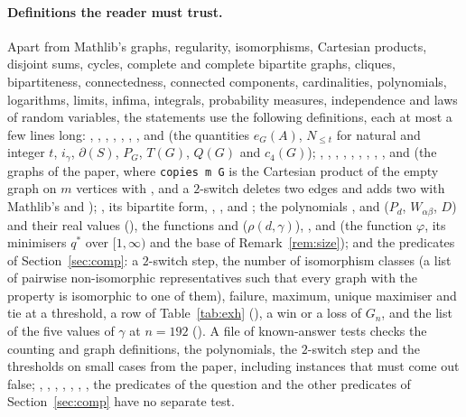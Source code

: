 \documentclass[11pt]{article}
\theoremstyle{remark}
\newcommand{\Nle}[1]{N_{\le #1}}
\begin{document}
\paragraph{Definitions the reader must trust.}
Apart from Mathlib's graphs, regularity, isomorphisms, Cartesian products,
disjoint sums, cycles, complete and complete bipartite graphs, cliques,
bipartiteness, connectedness, connected components, cardinalities,
polynomials, logarithms, limits, infima, integrals, probability measures,
independence
and laws of random variables, the statements use the following definitions,
each at most a few lines long: , , ,
, , , ,
 and  (the quantities $e_G(A)$, $\Nle t$ for natural and
integer $t$, $i_\gamma$, $\partial(S)$, $P_G$, $T(G)$, $Q(G)$ and $c_4(G)$);
, , , , ,
, , , ,  and
 (the
graphs of the paper, where \texttt{copies m G} is the Cartesian product of the
empty graph on $m$ vertices with , and a $2$-switch deletes two edges
and adds two with Mathlib's  and );
, its bipartite form, ,
,  and ; the polynomials
,  and  ($P_d$, $W_{\alpha\beta}$, $D$) and
their real values (), the
functions  and  ($\rho(d,\gamma)$), ,
 and  (the function $\varphi$, its minimisers
$q^*$ over $[1,\infty)$ and the base of Remark~\ref{rem:size}); and the
predicates of Section~\ref{sec:comp}: a $2$-switch step, the number of
isomorphism classes (a list of pairwise non-isomorphic representatives such
that every graph with the property is isomorphic to one of them), failure,
maximum, unique maximiser and tie at a threshold, a row of
Table~\ref{tab:exh} (), a win or a loss of $G_n$, and the
list of the five values of $\gamma$ at $n=192$ (). A file
of known-answer tests checks the counting and graph definitions, the
polynomials, the $2$-switch step and the thresholds on small cases from the
paper, including instances that must come out false; , ,
, , , ,
, the predicates of the question and the other predicates of
Section~\ref{sec:comp} have no separate test.
\end{document}
